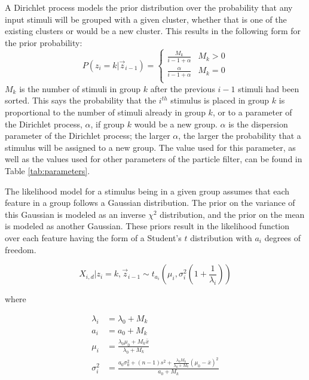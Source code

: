 A Dirichlet process models the prior distribution over the probability that
any input stimuli will be grouped with a given cluster, whether that is one
of the existing clusters or would be a new cluster. This results in the
following form for the prior probability:
\begin{equation}
P(z_i = k | \vec{z}_{i-1}) = 
\begin{cases}
  \frac{M_k}{i - 1 + \alpha} & M_k > 0 \\
  \frac{\alpha}{i - 1 + \alpha} & M_k = 0 \\
\end{cases}
\end{equation}
$M_k$ is the number of stimuli in group $k$ after the previous $i - 1$ stimuli
had been sorted. This says the probability that the $i^{th}$ stimulus is placed
in group $k$ is proportional to the number of stimuli already in group $k$, or
to a parameter of the Dirichlet process, $\alpha$, if group $k$ would be a new
group. $\alpha$ is the dispersion parameter of the Dirichlet process; the larger
$\alpha$, the larger the probability that a stimulus will be assigned to a new
group. The value used for this parameter, as well as the values used for other
parameters of the particle filter, can be found in Table \ref{tab:parameters}.

The likelihood model for a stimulus being in a given group assumes that each
feature in a group follows a Gaussian distribution. The prior on the variance of
this Gaussian is modeled as an inverse $\chi^2$ distribution, and the prior on
the mean is modeled as another Gaussian. These priors result in the
likelihood function over each feature having the form of a Student's $t$
distribution with $a_i$ degrees of freedom. 

\begin{equation}
X_{i,d} | z_i = k,  \vec{z}_{i-1} \sim
t_{a_i}\left(\mu_i, \sigma_i^2 \left(1 + \frac{1}{\lambda_i}\right) \right)
\label{eq:feature-likelihood}
\end{equation}

where

\begin{align}
  \lambda_i &= \lambda_0 + M_k \\
  a_i &= a_0 + M_k \\
  \mu_i &= \frac{\lambda_0 \mu_0 + M_k \bar{x}}{\lambda_0 + M_k} \\
  \sigma_i^2 &= \frac{a_0 \sigma_0^2 + (n - 1) s^2 + \frac{\lambda_0
      M_k}{\lambda_0 + M_k} (\mu_0 - \bar{x})^2}{a_0 + M_k}\\
\end{align}

